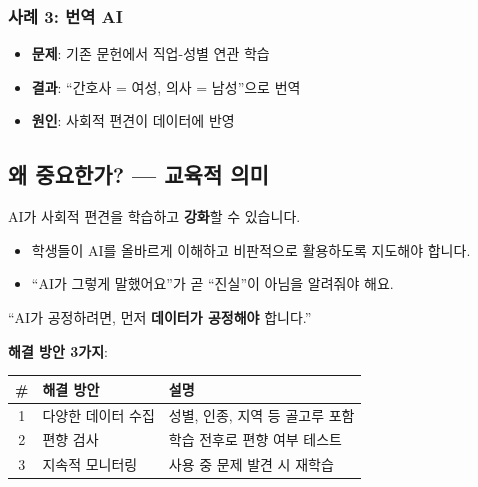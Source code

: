 \documentclass[11pt,a4paper]{article}
\begin{document}
\subsubsection{ 사례 3: 번역 AI}

\begin{itemize}[nosep]
    \item \textbf{문제}: 기존 문헌에서 직업-성별 연관 학습
    \item \textbf{결과}: ``간호사 = 여성, 의사 = 남성''으로 번역
    \item \textbf{원인}: 사회적 편견이 데이터에 반영
\end{itemize}

\subsection{왜 중요한가? --- 교육적 의미}

AI가 사회적 편견을 학습하고 \textbf{강화}할 수 있습니다.

\begin{keybox}
\begin{itemize}[nosep]
    \item 학생들이 AI를 올바르게 이해하고 비판적으로 활용하도록 지도해야 합니다.
    \item ``AI가 그렇게 말했어요''가 곧 ``진실''이 아님을 알려줘야 해요.
\end{itemize}
\end{keybox}

\begin{tipbox}
``AI가 공정하려면, 먼저 \textbf{데이터가 공정해야} 합니다.''
\end{tipbox}

\textbf{해결 방안 3가지}:

\begin{center}
\begin{tabular}{|c|p{3cm}|p{7cm}|}
\hline
\rowcolor{tableheader}
\textbf{\#} & \textbf{해결 방안} & \textbf{설명} \\
\hline
1 & 다양한 데이터 수집 & 성별, 인종, 지역 등 골고루 포함 \\
\hline
2 & 편향 검사 & 학습 전후로 편향 여부 테스트 \\
\hline
3 & 지속적 모니터링 & 사용 중 문제 발견 시 재학습 \\
\hline
\end{tabular}
\end{center}
\end{document}
